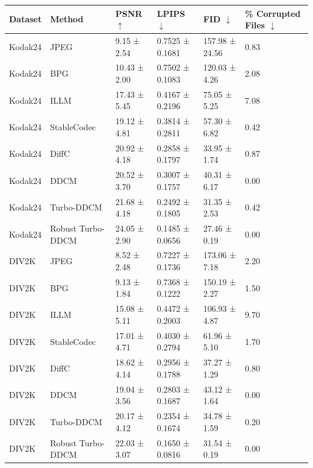 \begin{tabular}{llllll}
\toprule
Dataset & Method & PSNR $\uparrow$ & LPIPS $\downarrow$ & FID $\downarrow$ & \% Corrupted Files $\downarrow$ \\
\midrule
Kodak24 & JPEG & 9.15 ± 2.54 & 0.7525 ± 0.1681 & 157.98 ± 24.56 & 0.83 \\
Kodak24 & BPG & 10.43 ± 2.00 & 0.7502 ± 0.1083 & 120.03 ± 4.26 & 2.08 \\
Kodak24 & ILLM & 17.43 ± 5.45 & 0.4167 ± 0.2196 & 75.05 ± 5.25 & 7.08 \\
Kodak24 & StableCodec & 19.12 ± 4.81 & 0.3814 ± 0.2811 & 57.30 ± 6.82 & 0.42 \\
Kodak24 & DiffC & 20.92 ± 4.18 & 0.2858 ± 0.1797 & 33.95 ± 1.74 & 0.87 \\
Kodak24 & DDCM & 20.52 ± 3.70 & 0.3007 ± 0.1757 & 40.31 ± 6.17 & 0.00 \\
Kodak24 & Turbo-DDCM & 21.68 ± 4.18 & 0.2492 ± 0.1805 & 31.35 ± 2.53 & 0.42 \\
Kodak24 & Robust Turbo-DDCM & 24.05 ± 2.90 & 0.1485 ± 0.0656 & 27.46 ± 0.19 & 0.00 \\
DIV2K & JPEG & 8.52 ± 2.48 & 0.7227 ± 0.1736 & 173.06 ± 7.18 & 2.20 \\
DIV2K & BPG & 9.13 ± 1.84 & 0.7368 ± 0.1222 & 150.19 ± 2.27 & 1.50 \\
DIV2K & ILLM & 15.08 ± 5.11 & 0.4472 ± 0.2003 & 106.93 ± 4.87 & 9.70 \\
DIV2K & StableCodec & 17.01 ± 4.71 & 0.4030 ± 0.2794 & 61.96 ± 5.10 & 1.70 \\
DIV2K & DiffC & 18.62 ± 4.14 & 0.2956 ± 0.1788 & 37.27 ± 1.29 & 0.80 \\
DIV2K & DDCM & 19.04 ± 3.56 & 0.2803 ± 0.1687 & 43.12 ± 1.64 & 0.00 \\
DIV2K & Turbo-DDCM & 20.17 ± 4.12 & 0.2354 ± 0.1674 & 34.78 ± 1.59 & 0.20 \\
DIV2K & Robust Turbo-DDCM & 22.03 ± 3.07 & 0.1650 ± 0.0816 & 31.54 ± 0.19 & 0.00 \\
\bottomrule
\end{tabular}
